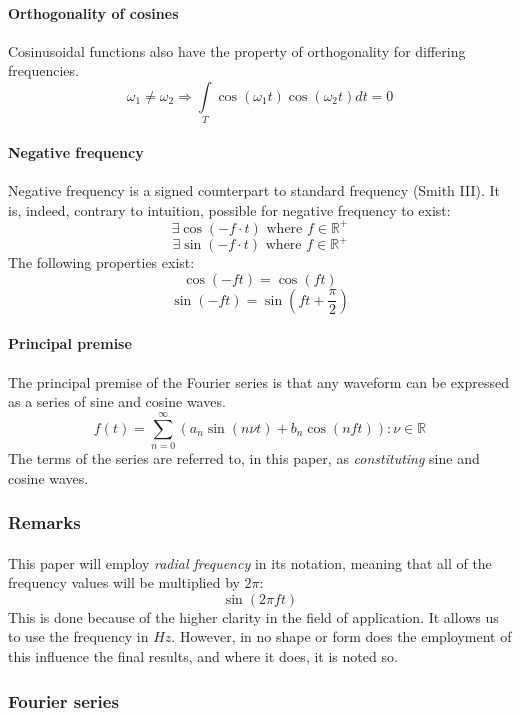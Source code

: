 \documentclass{article}
\begin{document}
\paragraph{Orthogonality of cosines}
Cosinusoidal functions also have the property of orthogonality for differing
frequencies.
$$\omega_1 \neq \omega_2 \Rightarrow \int\limits_T \cos (\omega_1 t) \cos(\omega_2 t)
dt = 0$$

\paragraph*{Negative frequency}
Negative frequency is a signed counterpart to standard frequency (Smith III).
It is, indeed, contrary to intuition, possible for negative frequency to exist:
$$\exists \cos (-f \cdot t)\text{ where }f \in \mathbb{R}^{+}$$
$$\exists \sin (-f \cdot t)\text{ where }f \in \mathbb{R}^{+}$$
The following properties exist:
$$\cos (-f t) = \cos(f t)$$
$$\sin (-f t) = \sin \left( f t + \frac{\pi}{2} \right)$$

\paragraph*{Principal premise}
The principal premise of the Fourier series is that any waveform can be
expressed as a series of sine and cosine waves.
$$f(t) = \sum_{n = 0}^{\infty} (a_n \sin(n \nu t) + b_n \cos(n f t)) : \nu \in
\mathbb{R}$$
The terms of the series are referred to, in this paper, as
\textit{constituting} sine and cosine waves.

\subsubsection{Remarks}

\paragraph*{}
This paper will employ \textit{radial frequency} in its notation, meaning that
all of the frequency values will be multiplied by $2 \pi$:
$$\sin ( 2 \pi f t)$$
This is done because of the higher clarity in the field of application. It
allows us to use the frequency in $Hz$.  However, in no shape or form does the
employment of this influence the final results, and where it does, it is noted
so.

\subsubsection{Fourier series}
\end{document}
